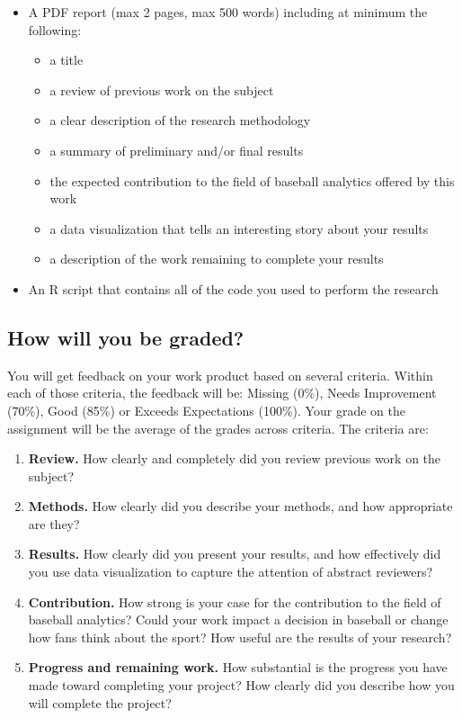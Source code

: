 \documentclass{article}
\begin{document}
        \begin{itemize}
          \item A PDF report (max 2 pages, max 500 words) including at minimum the following:
          \begin{itemize}
            \item a title
            \item a review of previous work on the subject
            \item a clear description of the research methodology
            \item a summary of preliminary and/or final results
            \item the expected contribution to the field of baseball analytics offered by this work
            \item a data visualization that tells an interesting story about your results
            \item a description of the work remaining to complete your results
          \end{itemize}
          \item An R script that contains all of the code you used to perform the research
        \end{itemize}

    \subsection*{\sc How will you be graded?}

      You will get feedback on your work product based on several criteria. Within each of those criteria, the feedback will be: Missing (0\%), Needs Improvement (70\%), Good (85\%) or Exceeds Expectations (100\%). Your grade on the assignment will be the average of the grades across criteria. The criteria are:
      \begin{enumerate}
        \item {\bf Review.} How clearly and completely did you review previous work on the subject?
        \item {\bf Methods.} How clearly did you describe your methods, and how appropriate are they?
        \item {\bf Results.} How clearly did you present your results, and how effectively did you use data visualization to capture the attention of abstract reviewers?
        \item {\bf Contribution.} How strong is your case for the contribution to the field of baseball analytics? Could your work impact a decision in baseball or change how fans think about the sport? How useful are the results of your research?
        \item {\bf Progress and remaining work.} How substantial is the progress you have made toward completing your project? How clearly did you describe how you will complete the project?
      \end{enumerate}
  
\end{document}
